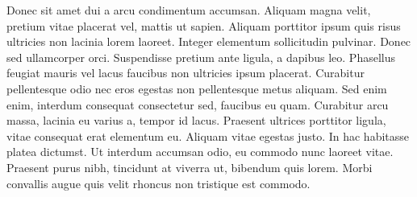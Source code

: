 Donec sit amet dui a arcu condimentum accumsan. Aliquam magna velit, pretium vitae placerat vel, mattis ut sapien. Aliquam porttitor ipsum quis risus ultricies non lacinia lorem laoreet. Integer elementum sollicitudin pulvinar. Donec sed ullamcorper orci. Suspendisse pretium ante ligula, a dapibus leo. Phasellus feugiat mauris vel lacus faucibus non ultricies ipsum placerat. Curabitur pellentesque odio nec eros egestas non pellentesque metus aliquam. Sed enim enim, interdum consequat consectetur sed, faucibus eu quam. Curabitur arcu massa, lacinia eu varius a, tempor id lacus. Praesent ultrices porttitor ligula, vitae consequat erat elementum eu. Aliquam vitae egestas justo. In hac habitasse platea dictumst. Ut interdum accumsan odio, eu commodo nunc laoreet vitae. Praesent purus nibh, tincidunt at viverra ut, bibendum quis lorem. Morbi convallis augue quis velit rhoncus non tristique est commodo.

